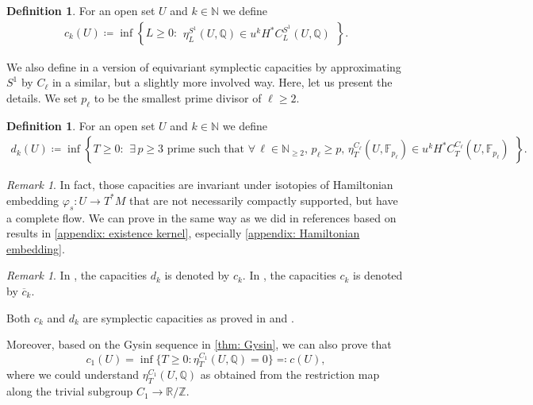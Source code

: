 \documentclass[11pt]{amsart}
\numberwithin{equation}{section}
\theoremstyle{plain}
\theoremstyle{definition}
\newtheorem{Def}[def]{Definition}
\theoremstyle{remark}
\newtheorem{RMK}[rmk]{Remark}
\newcommand{\bF} { {\mathbb{F}}}
\newcommand{\bQ} { {\mathbb{Q}}}
\newcommand{\bZ} { {\mathbb{Z}}}
\newcommand{\bR} { {\mathbb{R}}}
\newcommand{\bN} { {\mathbb{N}}}
\newcommand{\bO} { {\mathbb{N}_{\geq 2}}}
\begin{document}
\begin{Def}\label{def: entire S1 capacities}For an open set $U$ and $k\in \bN$ we define
\begin{align*} c_k(U) \coloneqq \inf
\left\lbrace
  L \geq 0:\begin{aligned} \eta^{S^1}_L (U,\bQ) \in u^kH^*C^{S^1}_L(U,\bQ)
  \end{aligned}
\right\rbrace.
\end{align*}

\end{Def}
We also define in \cite{Capacities2021}  a version of equivariant symplectic capacities by approximating $S^1$ by $C_\ell$ in a similar, but a slightly more involved     way. Here, let us present the details. We set $p_\ell$ to be the smallest prime divisor of $\ell \geq 2$. 
\begin{Def}\label{def: discrete S1 capacities}For an open set $U$ and $k\in \bN$ we define
\begin{align*} 
d_k(U)  \coloneqq \inf
\left\lbrace
  T \geq 0:\begin{aligned} \exists\, p\geq 3\text{ prime such that }\forall\,\ell \in \bO, \, p_\ell \geq p,\,  \eta^{C_\ell}_T(U,\bF_{p_\ell}) \in u^kH^{*}C^{C_\ell}_T(U,\bF_{p_\ell})
  \end{aligned}
\right\rbrace.
\end{align*}
\end{Def}

\begin{RMK}In fact, those capacities are invariant under isotopies of Hamiltonian embedding $\varphi_s: U\to T^*M$ that are not necessarily compactly supported, but have a complete flow. We can prove in the same way as we did in references based on results in \autoref{appendix: existence kernel}, especially \autoref{appendix: Hamiltonian embedding}.    
\end{RMK}
\begin{RMK} In \cite{Capacities2021}, the capacities $d_k$ is denoted by $c_k$. In \cite[Section 3.9]{CyclicZHANG}, the capacities $c_k$ is denoted by $\overline{c}_k$.
\end{RMK}
Both $c_k$ and $d_k$ are symplectic capacities as proved in \cite{Capacities2021} and \cite[Section 3.9]{CyclicZHANG}.

Moreover, based on the Gysin sequence in \autoref{thm: Gysin}, we can also prove that
\begin{equation}\label{equation: non-equivariant by Gyin}
 c_1(U)=\inf\{T\geq 0: \eta^{C_1}_T(U,\bQ)=0\}\eqqcolon c(U),
\end{equation}
where we could understand $\eta^{C_1}_T(U,\bQ)$ as obtained  from the restriction map along the trivial subgroup $C_1 \rightarrow \bR/\bZ$. 
 
\end{document}
